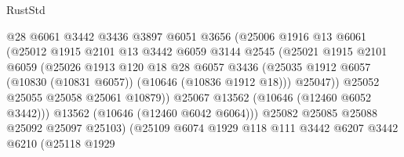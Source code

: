 \begin{lexlean}{RustStd}
\begin{coremodule}
                                @28
                                @6061
                                @3442
                                @3436
                                @3897
                                @6051
                                @3656
                                (@25006
                                  @1916
                                  @13
                                  @6061
                                  (@25012
                                    @1915
                                    @2101
                                    @13
                                    @3442
                                    @6059
                                    @3144
                                    @2545
                                    (@25021
                                      @1915
                                      @2101
                                      @6059
                                      (@25026
                                        @1913
                                        @120
                                        @18
                                        @28
                                        @6057
                                        @3436
                                        (@25035
                                          @1912
                                          @6057
                                          (@10830 (@10831 @6057))
                                          (@10646 (@10836 @1912 @18)))
                                        @25047))
                                    @25052
                                    @25055
                                    @25058
                                    @25061
                                    @10879))
                                @25067
                                @13562
                                (@10646 (@12460 @6052 @3442)))
                              @13562
                              (@10646 (@12460 @6042 @6064)))
                            @25082
                            @25085
                            @25088
                            @25092
                            @25097
                            @25103)
                          (@25109
                            @6074
                            @1929
                            @118
                            @111
                            @3442
                            @6207
                            @3442
                            @6210
                            (@25118
                              @1929

\end{coremodule}
\end{lexlean}
